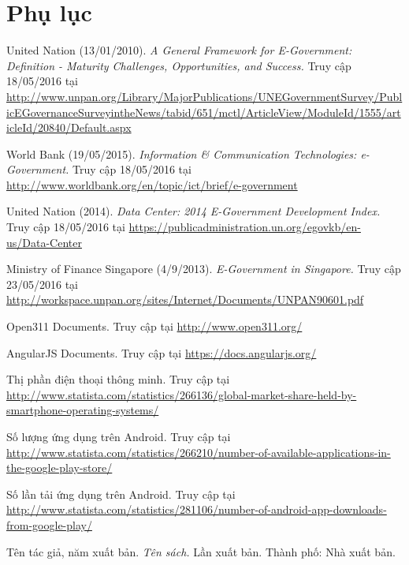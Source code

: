 \documentclass[a4paper]{article}
\begin{document}
\section{Phụ lục}
\begin{thebibliography}{99}
United Nation (13/01/2010). \textit{A General Framework for E-Government: Definition - Maturity Challenges, Opportunities, and Success.} Truy cập 18/05/2016 tại \url{http://www.unpan.org/Library/MajorPublications/UNEGovernmentSurvey/PublicEGovernanceSurveyintheNews/tabid/651/mctl/ArticleView/ModuleId/1555/articleId/20840/Default.aspx}

World Bank (19/05/2015). \textit{Information \& Communication Technologies: e-Government.} Truy cập 18/05/2016 tại \url{http://www.worldbank.org/en/topic/ict/brief/e-government}

United Nation (2014). \textit{Data Center: 2014 E-Government Development Index.} Truy cập 18/05/2016 tại \url{https://publicadministration.un.org/egovkb/en-us/Data-Center}

Ministry of Finance Singapore (4/9/2013). \textit{E-Government in Singapore.} Truy cập 23/05/2016 tại \url{http://workspace.unpan.org/sites/Internet/Documents/UNPAN90601.pdf}

Open311 Documents. Truy cập tại
 \url{http://www.open311.org/} 
 
AngularJS Documents. Truy cập tại
 \url{https://docs.angularjs.org/} 
 
Thị phần điện thoại thông minh. Truy cập tại
 \url{http://www.statista.com/statistics/266136/global-market-share-held-by-smartphone-operating-systems/} 

Số lượng ứng dụng trên Android. Truy cập tại
 \url{http://www.statista.com/statistics/266210/number-of-available-applications-in-the-google-play-store/}
 
Số lần tải ứng dụng trên Android. Truy cập tại
 \url{http://www.statista.com/statistics/281106/number-of-android-app-downloads-from-google-play/}
 
\bibitem{}
Tên tác giả, năm xuất bản. \textit{Tên sách.} Lần xuất bản. Thành phố: Nhà xuất bản.


\end{thebibliography}

\newpage
\end{document}

